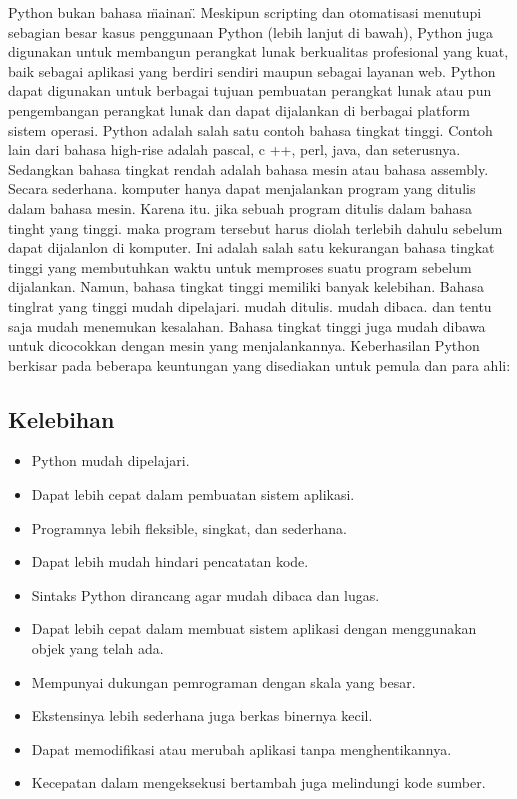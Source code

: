 	Python bukan bahasa \"mainan\". Meskipun scripting dan otomatisasi menutupi sebagian besar kasus penggunaan Python (lebih lanjut di bawah), Python juga digunakan untuk membangun perangkat lunak berkualitas profesional yang kuat, baik sebagai aplikasi yang berdiri sendiri maupun sebagai layanan web.
	Python dapat digunakan untuk berbagai tujuan pembuatan perangkat lunak atau pun pengembangan perangkat lunak dan dapat dijalankan di berbagai platform sistem operasi. Python adalah salah satu contoh bahasa tingkat tinggi. 
	Contoh lain dari bahasa high-rise adalah pascal, c ++, perl, java, dan seterusnya. Sedangkan bahasa tingkat rendah adalah bahasa mesin atau bahasa assembly. 
	Secara sederhana. komputer hanya dapat menjalankan program yang ditulis dalam bahasa mesin. Karena itu. jika sebuah program ditulis dalam bahasa tinght yang tinggi. maka program tersebut harus diolah terlebih dahulu sebelum dapat dijalanlon di komputer. 
	Ini adalah salah satu kekurangan bahasa tingkat tinggi yang membutuhkan waktu untuk memproses suatu program sebelum dijalankan. Namun, bahasa tingkat tinggi memiliki banyak kelebihan. Bahasa tinglrat yang tinggi mudah dipelajari. mudah ditulis. mudah dibaca. dan tentu saja mudah menemukan kesalahan. Bahasa tingkat tinggi juga mudah dibawa untuk dicocokkan dengan mesin yang menjalankannya. 
	Keberhasilan Python berkisar pada beberapa keuntungan yang disediakan untuk pemula dan para ahli:
	
	\subsection{Kelebihan}
		\begin{itemize}
			\item Python mudah dipelajari.
			\item Dapat lebih cepat dalam pembuatan sistem aplikasi.
			\item Programnya lebih fleksible, singkat, dan sederhana.
			\item Dapat lebih mudah hindari pencatatan kode.
			\item Sintaks Python dirancang agar mudah dibaca dan lugas.
			\item Dapat lebih cepat dalam membuat sistem aplikasi dengan menggunakan objek yang telah ada.
			\item Mempunyai dukungan pemrograman dengan skala yang besar.
			\item Ekstensinya lebih sederhana juga berkas binernya kecil.
			\item Dapat memodifikasi atau merubah aplikasi tanpa menghentikannya.
			\item Kecepatan dalam mengeksekusi bertambah juga melindungi kode sumber.
		\end{itemize}
		
